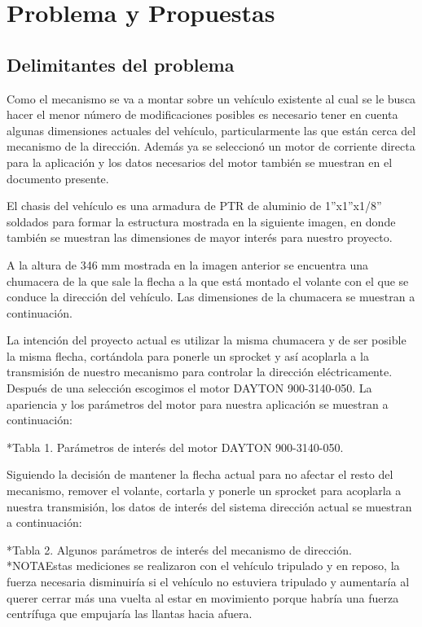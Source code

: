 \section{Problema y Propuestas}

\subsection{Delimitantes del problema}

Como el mecanismo se va a montar sobre un vehículo existente al cual se le busca hacer el menor número de modificaciones posibles es necesario tener en cuenta algunas dimensiones actuales del vehículo, particularmente las que están cerca del mecanismo de la dirección. Además ya se seleccionó un motor de corriente directa para la aplicación y los datos necesarios del motor también se muestran en el documento presente.

El chasis del vehículo es una armadura de PTR de aluminio de 1”x1”x1/8” soldados para formar la estructura mostrada en la siguiente imagen, en donde también se muestran las dimensiones de mayor interés para nuestro proyecto.



A la altura de 346 mm mostrada en la imagen anterior se encuentra una chumacera de la que sale la flecha a la que está montado el volante con el que se conduce la dirección del vehículo. Las dimensiones de la chumacera se muestran a continuación.



La intención del proyecto actual es utilizar la misma chumacera y de ser posible la misma flecha, cortándola para ponerle un sprocket y así acoplarla a la transmisión de nuestro mecanismo para controlar la dirección eléctricamente. Después de una selección escogimos el motor DAYTON 900-3140-050. La apariencia y los parámetros del motor para nuestra aplicación se muestran a continuación:



*Tabla 1. Parámetros de interés del motor DAYTON 900-3140-050.

Siguiendo la decisión de mantener la flecha actual para no afectar el resto del mecanismo, remover el volante, cortarla y ponerle un sprocket para acoplarla a nuestra transmisión, los datos de interés del sistema dirección actual se muestran a continuación:

*Tabla 2. Algunos parámetros de interés del mecanismo de dirección.
*NOTAEstas mediciones se realizaron con el vehículo tripulado y en reposo, la fuerza necesaria disminuiría si el vehículo no estuviera tripulado y aumentaría al querer cerrar más una vuelta al estar en movimiento porque habría una fuerza centrífuga que empujaría las llantas hacia afuera.

